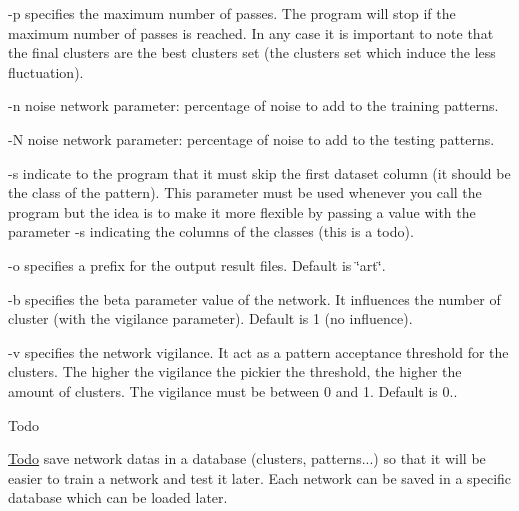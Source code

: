 -\/p specifies the maximum number of passes. The program will stop if the maximum number of passes is reached. In any case it is important to note that the final clusters are the best clusters set (the clusters set which induce the less fluctuation).

-\/n noise network parameter\-: percentage of noise to add to the training patterns.

-\/\-N noise network parameter\-: percentage of noise to add to the testing patterns.

-\/s indicate to the program that it must skip the first dataset column (it should be the class of the pattern). This parameter must be used whenever you call the program but the idea is to make it more flexible by passing a value with the parameter -\/s indicating the columns of the classes (this is a todo).

-\/o specifies a prefix for the output result files. Default is \char`\"{}art\char`\"{}.

-\/b specifies the beta parameter value of the network. It influences the number of cluster (with the vigilance parameter). Default is 1 (no influence).

-\/v specifies the network vigilance. It act as a pattern acceptance threshold for the clusters. The higher the vigilance the pickier the threshold, the higher the amount of clusters. The vigilance must be between 0 and 1. Default is 0..

\begin{DoxyRefDesc}{Todo}
\item[\hyperlink{todo__todo000005}{Todo}]save network datas in a database (clusters, patterns...) so that it will be easier to train a network and test it later. Each network can be saved in a specific database which can be loaded later. \end{DoxyRefDesc}
